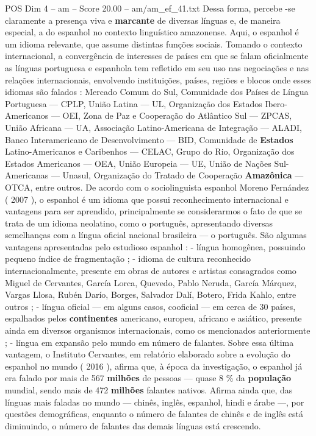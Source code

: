 \begin{textsample}{POS Dim 4 – am – Score 20.00 – am/am\_ef\_41.txt}
Dessa forma, percebe -se claramente a presença viva e \textbf{marcante} de diversas línguas e, de maneira especial, a do espanhol no contexto linguístico amazonense.
Aqui, o espanhol é um idioma relevante, que assume distintas funções sociais.
Tomando o contexto internacional, a convergência de interesses de países em que se falam oficialmente as línguas portuguesa e espanhola tem refletido em seu uso nas negociações e nas relações internacionais, envolvendo instituições, países, regiões e blocos onde esses idiomas são falados : Mercado Comum do Sul, Comunidade dos Países de Língua Portuguesa — CPLP, União Latina — UL, Organização dos Estados Ibero-Americanos — OEI, Zona de Paz e Cooperação do Atlântico Sul — ZPCAS, União Africana — UA, Associação Latino-Americana de Integração — ALADI, Banco Interamericano de Desenvolvimento — BID, Comunidade de \textbf{Estados} Latino-Americanos e Caribenhos — CELAC, Grupo do Rio, Organização dos Estados Americanos — OEA, União Europeia — UE, União de Nações Sul-Americanas — Unasul, Organização do Tratado de Cooperação \textbf{Amazônica} — OTCA, entre outros.
De acordo com o sociolinguista espanhol Moreno Fernández ( 2007 ), o espanhol é um idioma que possui reconhecimento internacional e vantagens para ser aprendido, principalmente se considerarmos o fato de que se trata de um idioma neolatino, como o português, apresentando diversas semelhanças com a língua oficial nacional brasileira — o português.
São algumas vantagens apresentadas pelo estudioso espanhol : - língua homogênea, possuindo pequeno índice de fragmentação ; - idioma de cultura reconhecido internacionalmente, presente em obras de autores e artistas consagrados como Miguel de Cervantes, García Lorca, Quevedo, Pablo Neruda, García Márquez, Vargas Llosa, Rubén Darío, Borges, Salvador Dalí, Botero, Frida Kahlo, entre outros ; - língua oficial — em alguns casos, cooficial — em cerca de 30 países, espalhados pelos \textbf{continentes} americano, europeu, africano e asiático, presente ainda em diversos organismos internacionais, como os mencionados anteriormente ; - língua em expansão pelo mundo em número de falantes.
Sobre essa última vantagem, o Instituto Cervantes, em relatório elaborado sobre a evolução do espanhol no mundo ( 2016 ), afirma que, à época da investigação, o espanhol já era falado por mais de 567 \textbf{milhões} de pessoas — quase 8 \% da \textbf{população} mundial, sendo mais de 472 \textbf{milhões} falantes nativos.
Afirma ainda que, das línguas mais faladas no mundo — chinês, inglês, espanhol, hindi e árabe —, por questões demográficas, enquanto o número de falantes de chinês e de inglês está diminuindo, o número de falantes das demais línguas está crescendo.

\end{textsample}
